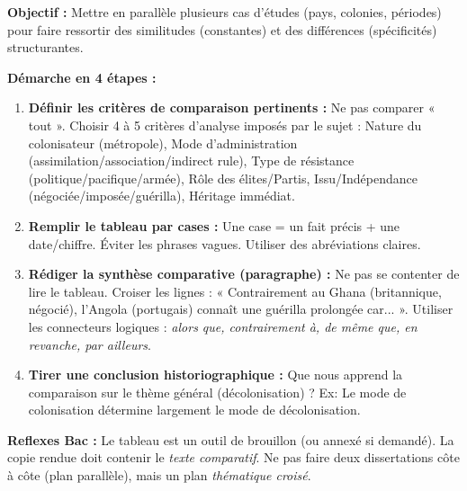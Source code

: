 \documentclass[11pt]{article}
\newcommand{\cle}[1]{{\popxbold\color{popdark}#1}}
\begin{document}
\begin{methode}
\textbf{Objectif :} Mettre en parallèle plusieurs cas d'études (pays, colonies, périodes) pour faire ressortir des similitudes (constantes) et des différences (spécificités) structurantes.
\par \textbf{Démarche en 4 étapes :}
\begin{enumerate}
    \item \textbf{Définir les critères de comparaison pertinents :} Ne pas comparer « tout ». Choisir 4 à 5 critères d'analyse imposés par le sujet : \cle{Nature du colonisateur} (métropole), \cle{Mode d'administration} (assimilation/association/indirect rule), \cle{Type de résistance} (politique/pacifique/armée), \cle{Rôle des élites/Partis}, \cle{Issu/Indépendance} (négociée/imposée/guérilla), \cle{Héritage immédiat}.
    \item \textbf{Remplir le tableau par cases :} Une case = un fait précis + une date/chiffre. Éviter les phrases vagues. Utiliser des abréviations claires.
    \item \textbf{Rédiger la synthèse comparative (paragraphe) :} Ne pas se contenter de lire le tableau. Croiser les lignes : « Contrairement au Ghana (britannique, négocié), l'Angola (portugais) connaît une guérilla prolongée car... ». Utiliser les connecteurs logiques : \emph{alors que, contrairement à, de même que, en revanche, par ailleurs}.
    \item \textbf{Tirer une conclusion historiographique :} Que nous apprend la comparaison sur le thème général (décolonisation) ? Ex: Le mode de colonisation détermine largement le mode de décolonisation.
\end{enumerate}
\par \textbf{Reflexes Bac :} Le tableau est un outil de brouillon (ou annexé si demandé). La copie rendue doit contenir le \emph{texte comparatif}. Ne pas faire deux dissertations côte à côte (plan parallèle), mais un plan \emph{thématique croisé}.
\end{methode}
\end{document}
